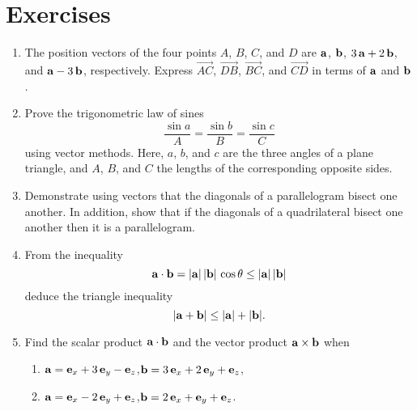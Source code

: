 \section{Exercises}
{\small 
\renewcommand{\theenumi}{A.\arabic{enumi}}
\begin{enumerate}
\item The position vectors of the four  points $A$, $B$, $C$, and $D$ are ${\bf a}$, ${\bf b}$, $3\,{\bf a}+2\,{\bf b}$,
and ${\bf a}-3\,{\bf b}$, respectively. Express $\stackrel{\displaystyle \rightarrow}{AC}$, $\stackrel{\displaystyle \rightarrow}{DB}$,
$\stackrel{\displaystyle \rightarrow}{BC}$, and $\stackrel{\displaystyle \rightarrow}{CD}$ in terms of ${\bf a}$ and ${\bf b}$. 
\item Prove the trigonometric law of sines 
$$
\frac{\sin a}{A} = \frac{\sin b}{B} = \frac{\sin c}{C}
$$
using vector methods. Here, $a$, $b$, and $c$ are  the three
angles of a plane triangle, and $A$, $B$, and $C$ the lengths of the corresponding opposite sides.

\item Demonstrate using vectors that the diagonals of a parallelogram bisect one another. In addition, show  that if the diagonals of a quadrilateral bisect one another then it is a parallelogram.

\item From the inequality
$$
{\bf a}\cdot{\bf b}= |{\bf a}|\,|{\bf b}|\,\cos\theta\leq |{\bf a}|\,|{\bf b}|
$$
deduce the triangle inequality
$$
|{\bf a} + {\bf b}|\leq |{\bf a}|+|{\bf b}|.
$$

\item Find the scalar product ${\bf a}\cdot{\bf b}$ and the vector product ${\bf a}\times {\bf b}$ when
\begin{enumerate}
\item ${\bf a} = {\bf e}_x + 3\,{\bf e}_y-{\bf e}_z$,\mbox{\hspace{0.5cm}}${\bf b} = 3\,{\bf e}_x+ 2\,{\bf e}_y+{\bf e}_z$,
\item ${\bf a} = {\bf e}_x - 2\,{\bf e}_y+{\bf e}_z$,\mbox{\hspace{0.5cm}}${\bf b} = 2\,{\bf e}_x+ {\bf e}_y+{\bf e}_z$.
\end{enumerate}


\end{enumerate}}
